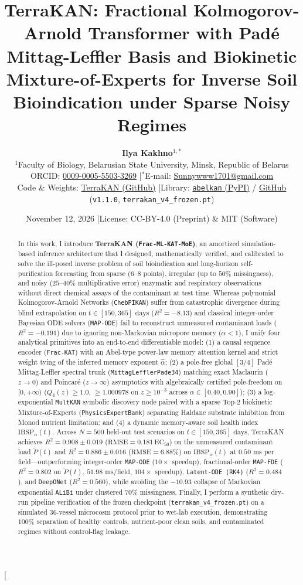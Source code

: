 \documentclass[10pt,twocolumn,a4paper]{article}
\title{\vspace*{-7mm}\textbf{\Large TerraKAN: Fractional Kolmogorov-Arnold Transformer with Pad\'e Mittag-Leffler Basis and Biokinetic Mixture-of-Experts for Inverse Soil Bioindication under Sparse Noisy Regimes}}
\author{
  \textbf{Ilya Kakhno}$^{1,*}$ \\
  \small $^{1}$Faculty of Biology, Belarusian State University, Minsk, Republic of Belarus \\
  \small ORCID: \href{https://orcid.org/0009-0005-5503-3269}{0009-0005-5503-3269} \quad|\quad $^{*}$E-mail: \href{mailto:Sunnywww1701@gmail.com}{Sunnywww1701@gmail.com} \\
  \small Code \& Weights: \href{https://github.com/Lolycut/TerraKAN}{TerraKAN (GitHub)} \quad|\quad Library: \href{https://pypi.org/project/abelkan/}{\texttt{abelkan} (PyPI)} / \href{https://github.com/Lolycut/abelkan}{GitHub}  \quad (\texttt{v1.1.0}, \texttt{terrakan\_v4\_frozen.pt})
}
\date{\small November 12, 2026 \quad|\quad License: CC-BY-4.0 (Preprint) \& MIT (Software)}
\begin{document}
\twocolumn[
  \begin{@twocolumnfalse}
    \maketitle
    \vspace*{-4mm}
    \begin{abstract}
      \noindent
      In this work, I introduce \textbf{TerraKAN (\texttt{Frac-ML-KAT-MoE})}, an amortized simulation-based inference architecture that I designed, mathematically verified, and calibrated to solve the ill-posed inverse problem of soil bioindication and long-horizon self-purification forecasting from sparse ($6\text{--}8$ points), irregular (up to $50\%$ missingness), and noisy ($25\text{--}40\%$ multiplicative error) enzymatic and respiratory observations without direct chemical assays of the contaminant at test time. Whereas polynomial Kolmogorov-Arnold Networks (\texttt{ChebPIKAN}) suffer from catastrophic divergence during blind extrapolation on $t \in {[150, 365]}\text{ days}$ ($R^2 = -8.13$) and classical integer-order Bayesian ODE solvers (\texttt{MAP-ODE}) fail to reconstruct unmeasured contaminant loads ($R^2 = -0.191$) due to ignoring non-Markovian micropore memory ($\alpha < 1$), I unify four analytical primitives into an end-to-end differentiable model: (1) a causal sequence encoder (\texttt{Frac-KAT}) with an Abel-type power-law memory attention kernel and strict weight tying of the inferred memory exponent $\hat{\alpha}$; (2) a pole-free global ${[3/4]}$ Pad\'e Mittag-Leffler spectral trunk (\texttt{MittagLefflerPade34}) matching exact Maclaurin ($z \to 0$) and Poincar\'e ($z \to \infty$) asymptotics with algebraically certified pole-freedom on $[0, +\infty)$ ($Q_4(z) \ge 1.0$, $\ge 1.000978$ on $z \ge 10^{-3}$ across $\alpha \in {[0.40, 0.90]}$); (3) a log-exponential \texttt{MultKAN} symbolic discovery node paired with a sparse Top-2 biokinetic Mixture-of-Experts (\texttt{PhysicsExpertBank}) separating Haldane substrate inhibition from Monod nutrient limitation; and (4) a dynamic memory-aware soil health index $\text{IBSP}_\alpha(t)$. Across $N=500$ held-out test scenarios on $t \in {[150, 365]}\text{ days}$, TerraKAN achieves $R^2 = 0.908 \pm 0.019$ ($\text{RMSE} = 0.181\,\text{EC}_{50}$) on the unmeasured contaminant load $\tilde{P}(t)$ and $R^2 = 0.886 \pm 0.016$ ($\text{RMSE} = 6.88\%$) on $\text{IBSP}_\alpha(t)$ at $0.50\text{ ms}$ per field---outperforming integer-order \texttt{MAP-ODE} ($10\times$ speedup), fractional-order \texttt{MAP-FDE} ($R^2 = 0.802$ on $\tilde{P}(t)$, $51.98\text{ ms/field}$, $104\times$ speedup), \texttt{Latent-ODE (RK4)} ($R^2 = 0.484$), and \texttt{DeepONet} ($R^2 = 0.560$), while avoiding the $-10.93$ collapse of Markovian exponential \texttt{ALiBi} under clustered $70\%$ missingness. Finally, I perform a synthetic dry-run pipeline verification of the frozen checkpoint (\texttt{terrakan\_v4\_frozen.pt}) on a simulated 36-vessel microcosm protocol prior to wet-lab execution, demonstrating $100\%$ separation of healthy controls, nutrient-poor clean soils, and contaminated regimes without control-flag leakage.
      \vspace*{2mm}
      

\end{abstract}
\end{@twocolumnfalse}
\end{document}
